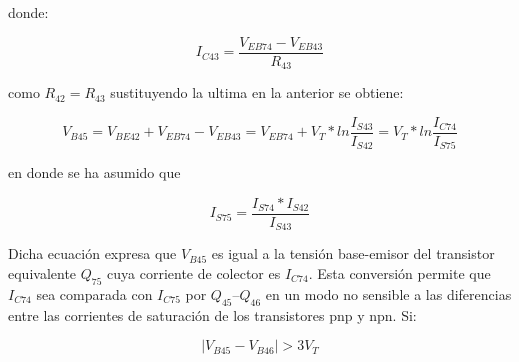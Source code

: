 \documentclass[12pt,a4paper,final,headinclude,footinclude,BCOR5mm]{scrartcl}
\begin{document}
donde:

$$I_{C43} = \frac{V_{EB74}-V_{EB43}}{R_{43}}$$

como $R_{42} = R_{43}$ sustituyendo la ultima en la anterior se obtiene:

\begin{equation}
V_{B45} = V_{BE42} + V_{EB74} - V_{EB43} = V_{EB74} + V_{T} * ln \frac{I_{S43}}{I_{S42}} = V_{T} * ln \frac{I_{C74}}{I_{S75}}
\label{a}
\end{equation}

en donde se ha asumido que

$$I_{S75} = \frac{I_{S74}*I_{S42}}{I_{S43}}$$

Dicha ecuación expresa que $V_{B45}$ es igual a la tensión base-emisor del transistor equivalente $Q_{75}$ cuya corriente de colector es $I_{C74}$. Esta conversión permite que   $I_{C74}$ sea comparada con $I_{C75}$ por $Q_{45} – Q_{46}$ en un modo no sensible a las diferencias entre las corrientes de saturación de los transistores pnp y npn. Si:

$$|V_{B45} - V_{B46}| > 3 V_{T}$$
\end{document}
